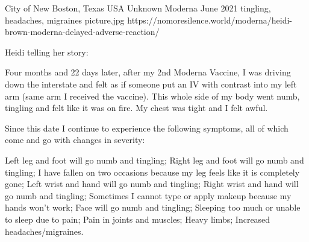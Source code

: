 {City of New Boston, Texas USA}
{Unknown}
{Moderna}
{June 2021}
{tingling, headaches, migraines}
{picture.jpg}
{https://nomoresilence.world/moderna/heidi-brown-moderna-delayed-adverse-reaction/}
{

Heidi telling her story:

Four months and 22 days later, after my 2nd Moderna Vaccine, I was driving down
the interstate and felt as if someone put an IV with contrast into my left arm
(same arm I received the vaccine). This whole side of my body went numb,
tingling and felt like it was on fire. My chest was tight and I felt awful.

Since this date I continue to experience the following symptoms, all of which
come and go with changes in severity:

Left leg and foot will go numb and tingling; Right leg and foot will go numb and
tingling; I have fallen on two occasions because my leg feels like it is
completely gone; Left wrist and hand will go numb and tingling; Right wrist and
hand will go numb and tingling; Sometimes I cannot type or apply makeup because
my hands won’t work; Face will go numb and tingling; Sleeping too much or unable
to sleep due to pain; Pain in joints and muscles; Heavy limbs; Increased
headaches/migraines.

}
